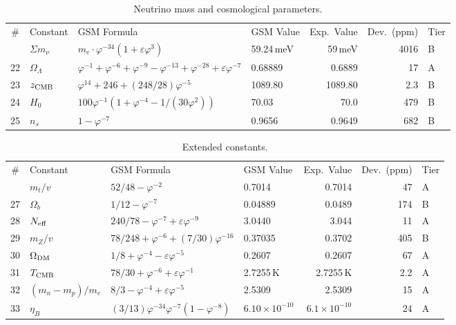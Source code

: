 \documentclass[aps,prd,twocolumn,superscriptaddress,nofootinbib,showpacs]{revtex4-2}
\newcommand{\Oml}{\Omega_\Lambda}
\newcommand{\Omb}{\Omega_b}
\newcommand{\Omdm}{\Omega_{\rm DM}}
\newcommand{\ns}{n_s}
\newcommand{\Neff}{N_{\rm eff}}
\newcommand{\TCMB}{T_{\rm CMB}}
\newcommand{\zcmb}{z_{\rm CMB}}
\begin{document}
\begin{table}[t]
\caption{\label{tab:neutrino}Neutrino mass and cosmological parameters.}
\begin{ruledtabular}
\begin{tabular}{clllrrl}
\# & Constant & GSM Formula & GSM Value & Exp.\ Value & Dev.\ (ppm) & Tier \\
\colrule
21 & $\Sigma m_\nu$ & $m_e\cdot\varphi^{-34}(1+\varepsilon\varphi^3)$ & 59.24\,meV & 59\,meV & 4016 & B \\
22 & $\Oml$ & $\varphi^{-1}+\varphi^{-6}+\varphi^{-9}-\varphi^{-13}+\varphi^{-28}+\varepsilon\varphi^{-7}$ & 0.68889 & 0.6889 & 17 & A \\
23 & $\zcmb$ & $\varphi^{14}+246+(248/28)\varphi^{-5}$ & 1089.80 & 1089.80 & 2.3 & B \\
24 & $H_0$ & $100\varphi^{-1}(1+\varphi^{-4}-1/(30\varphi^2))$ & 70.03 & 70.0 & 479 & B \\
25 & $\ns$ & $1-\varphi^{-7}$ & 0.9656 & 0.9649 & 682 & B \\
\end{tabular}
\end{ruledtabular}
\end{table}

\begin{table}[t]
\caption{\label{tab:extended}Extended constants.}
\begin{ruledtabular}
\begin{tabular}{clllrrl}
\# & Constant & GSM Formula & GSM Value & Exp.\ Value & Dev.\ (ppm) & Tier \\
\colrule
26 & $m_t/v$ & $52/48-\varphi^{-2}$ & 0.7014 & 0.7014 & 47 & A \\
27 & $\Omb$ & $1/12-\varphi^{-7}$ & 0.04889 & 0.0489 & 174 & B \\
28 & $\Neff$ & $240/78-\varphi^{-7}+\varepsilon\varphi^{-9}$ & 3.0440 & 3.044 & 11 & A \\
29 & $m_Z/v$ & $78/248+\varphi^{-6}+(7/30)\varphi^{-16}$ & 0.37035 & 0.3702 & 405 & B \\
30 & $\Omdm$ & $1/8+\varphi^{-4}-\varepsilon\varphi^{-5}$ & 0.2607 & 0.2607 & 67 & A \\
31 & $\TCMB$ & $78/30+\varphi^{-6}+\varepsilon\varphi^{-1}$ & 2.7255\,K & 2.7255\,K & 2.2 & A \\
32 & $(m_n\!-\!m_p)/m_e$ & $8/3-\varphi^{-4}+\varepsilon\varphi^{-5}$ & 2.5309 & 2.5309 & 15 & A \\
33 & $\eta_B$ & $(3/13)\varphi^{-34}\varphi^{-7}(1-\varphi^{-8})$ & $6.10\!\times\!10^{-10}$ & $6.1\!\times\!10^{-10}$ & 24 & A \\
\end{tabular}
\end{ruledtabular}
\end{table}
\end{document}
